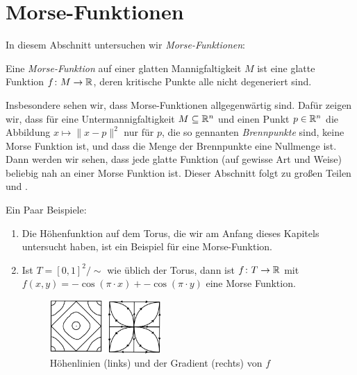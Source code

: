 \section{Morse-Funktionen}

In diesem Abschnitt untersuchen wir \textit{Morse-Funktionen}:

\begin{definition}
    \label{satz: morse-funktion}
    Eine \textit{Morse-Funktion} auf einer glatten Mannigfaltigkeit $M$ ist eine glatte Funktion
    $f \colon M \to { \mathbb R }$, deren kritische Punkte alle nicht degeneriert sind.
\end{definition}

Insbesondere sehen wir, dass Morse-Funktionen allgegenwärtig sind. Dafür zeigen wir, dass für 
eine Untermannigfaltigkeit $M \subseteq { \mathbb R }^n$ und einen Punkt $p \in { \mathbb R }^n$ die Abbildung
$x \mapsto \| x - p \|^2$ nur für $p$, die so gennanten \textit{Brennpunkte}
sind, keine Morse Funktion ist, und dass die Menge der Brennpunkte eine Nullmenge ist. Dann werden
wir sehen, dass jede glatte Funktion (auf gewisse Art und Weise) beliebig nah an einer Morse 
Funktion ist. Dieser Abschnitt folgt zu großen Teilen \cite{milnor} und \cite{audin}.

\begin{example}
    \label{bsp: morse funktion}
    Ein Paar Beispiele:
    \begin{enumerate}
        \item Die Höhenfunktion auf dem Torus, die wir am Anfang dieses Kapitels untersucht haben, ist 
            ein Beispiel für eine Morse-Funktion.
        \item Ist $T = [0, 1]^2 / \sim$ wie üblich der Torus, dann ist $f \colon T \to { \mathbb R }$ mit 
            $f(x, y) = -\cos(\pi \cdot x) + -\cos(\pi \cdot y)$ eine Morse Funktion. 
            \begin{figure}[H]
                \centering
                \includegraphics[width=0.4\textwidth]{../resources/morse-funktion-torus.jpeg}
                \caption{Höhenlinien (links) und der Gradient (rechts) von $f$}
            \end{figure}
    \end{enumerate}
\end{example}

